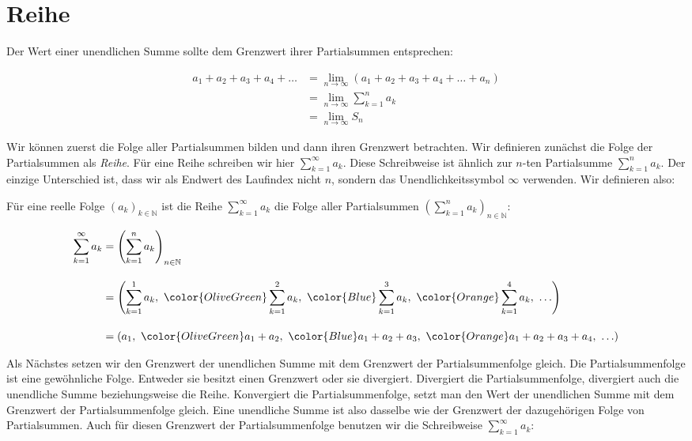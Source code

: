\documentclass[fontsize=9pt,
               parskip=half-,
               DIV=14,
               listof=chapterentry,
               tocflat]{scrbook}
\begin{document}
\section{Reihe}

Der Wert einer unendlichen Summe sollte dem Grenzwert ihrer Partialsummen entsprechen:

\begin{align*}
a_{1}+a_{2}+a_{3}+a_{4}+\ldots &=\lim _{n\to \infty }(a_{1}+a_{2}+a_{3}+a_{4}+\ldots +a_{n})\\&=\lim _{n\to \infty }\sum _{k=1}^{n}a_{k}\\&=\lim _{n\to \infty }S_{n}
\end{align*}

Wir können zuerst die Folge aller Partialsummen bilden und dann ihren Grenzwert betrachten. Wir definieren zunächst die Folge der Partialsummen als \emph{Reihe}. Für eine Reihe schreiben wir hier $\sum _{k=1}^{\infty }a_{k}$. Diese Schreibweise ist ähnlich zur $n$-ten Partialsumme $\sum _{k=1}^{n}a_{k}$. Der einzige Unterschied ist, dass wir als Endwert des Laufindex nicht $n$, sondern das Unendlichkeitssymbol $\infty $ verwenden. Wir definieren also:

\begin{definition*}[Reihe]
Für eine reelle Folge $(a_{k})_{k\in \mathbb {N} }$ ist die Reihe $\sum _{k=1}^{\infty }a_{k}$ die Folge aller Partialsummen $\left(\sum _{k=1}^{n}a_{k}\right)_{n\in \mathbb {N} }$:

\begin{align*}
\sum _{k=1}^{\infty }a_{k}&=\left(\sum _{k=1}^{n}a_{k}\right)_{n\in \mathbb {N} }\\[1em]&=\left(\sum _{k=1}^{1}a_{k},\ {\color {OliveGreen}\sum _{k=1}^{2}a_{k}},\ {\color {Blue}\sum _{k=1}^{3}a_{k}},\ {\color {Orange}\sum _{k=1}^{4}a_{k}},\ \ldots \right)\\[1em]&=\left(a_{1},\ {\color {OliveGreen}a_{1}+a_{2}},\ {\color {Blue}a_{1}+a_{2}+a_{3}},\ {\color {Orange}a_{1}+a_{2}+a_{3}+a_{4}},\ \ldots \right)
\end{align*}

\end{definition*}

Als Nächstes setzen wir den Grenzwert der unendlichen Summe mit dem Grenzwert der Partialsummenfolge gleich. Die Partialsummenfolge ist eine gewöhnliche Folge. Entweder sie besitzt einen Grenzwert oder sie divergiert. Divergiert die Partialsummenfolge, divergiert auch die unendliche Summe beziehungsweise die Reihe. Konvergiert die Partialsummenfolge, setzt man den Wert der unendlichen Summe mit dem Grenzwert der Partialsummenfolge gleich. Eine unendliche Summe ist also dasselbe wie der Grenzwert der dazugehörigen Folge von Partialsummen. Auch für diesen Grenzwert der Partialsummenfolge benutzen wir die Schreibweise $\sum _{k=1}^{\infty }a_{k}$:
\end{document}
